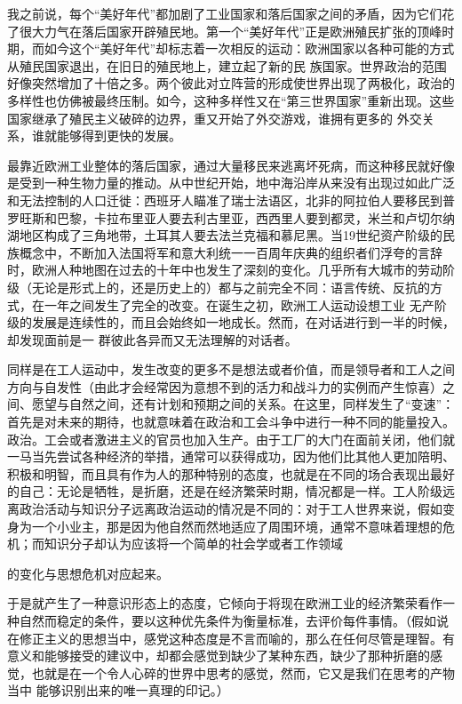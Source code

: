 \documentclass{article}
\begin{document}
我之前说，每个“美好年代”都加剧了工业国家和落后国家之间的矛盾，因为它们花了很大力气在落后国家开辟殖民地。第一个“美好年代”正是欧洲殖民扩张的顶峰时期，而如今这个“美好年代”却标志着一次相反的运动：欧洲国家以各种可能的方式从殖民国家退出，在旧日的殖民地上，建立起了新的民
\newpage
族国家。世界政治的范围好像突然增加了十倍之多。两个彼此对立阵营的形成使世界出现了两极化，政治的多样性也仿佛被最终压制。如今，这种多样性又在“第三世界国家”重新出现。这些国家继承了殖民主义破碎的边界，重又开始了外交游戏，谁拥有更多的
外交关系，谁就能够得到更快的发展。 

最靠近欧洲工业整体的落后国家，通过大量移民来逃离坏死病，而这种移民就好像是受到一种生物力量的推动。从中世纪开始，地中海沿岸从来没有出现过如此广泛和无法控制的人口迁徙：西班牙人瞄准了瑞士法语区，北非的阿拉伯人要移民到普罗旺斯和巴黎，卡拉布里亚人要去利古里亚，西西里人要到都灵，米兰和卢切尔纳湖地区构成了三角地带，土耳其人要去法兰克福和慕尼黑。当19世纪资产阶级的民族概念中，不断加入法国将军和意大利统一一百周年庆典的组织者们浮夸的言辞时，欧洲人种地图在过去的十年中也发生了深刻的变化。几乎所有大城市的劳动阶级（无论是形式上的，还是历史上的）都与之前完全不同：语言传统、反抗的方式，在一年之间发生了完全的改变。在诞生之初，欧洲工人运动设想工业
\newpage
无产阶级的发展是连续性的，而且会始终如一地成长。然而，在对话进行到一半的时候，却发现面前是一
群彼此各异而又无法理解的对话者。 

同样是在工人运动中，发生改变的更多不是想法或者价值，而是领导者和工人之间方向与自发性（由此才会经常因为意想不到的活力和战斗力的实例而产生惊喜）之间、愿望与自然之间，还有计划和预期之间的关系。在这里，同样发生了“变速”：首先是对未来的期待，也就意味着在政治和工会斗争中进行一种不同的能量投入。政治。工会或者激进主义的官员也加入生产。由于工厂的大门在面前关闭，他们就一马当先尝试各种经济的举措，通常可以获得成功，因为他们比其他人更加陪明、积极和明智，而且具有作为人的那种特别的态度，也就是在不同的场合表现出最好的自己：无论是牺牲，是折磨，还是在经济繁荣时期，情况都是一样。工人阶级远离政治活动与知识分子远离政治运动的情况是不同的：对于工人世界来说，假如变身为一个小业主，那是因为他自然而然地适应了周围环境，通常不意味着理想的危机；而知识分子却认为应该将一个简单的社会学或者工作领域
\newpage

的变化与思想危机对应起来。 

于是就产生了一种意识形态上的态度，它倾向于将现在欧洲工业的经济繁荣看作一种自然而稳定的条件，要以这种优先条件为衡量标准，去评价每件事情。（假如说在修正主义的思想当中，感党这种态度是不言而喻的，那么在任何尽管是理智。有意义和能够接受的建议中，却都会感觉到缺少了某种东西，缺少了那种折磨的感觉，也就是在一个令人心碎的世界中思考的感觉，然而，它又是我们在思考的产物当中
能够识别出来的唯一真理的印记。） 
\end{document}
